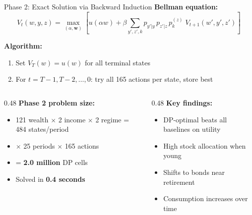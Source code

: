 \documentclass[aspectratio=169, 11pt]{beamer}
\begin{document}
\begin{frame}{Phase 2: Exact Solution via Backward Induction}
\textbf{Bellman equation:}
\[
V_t(w, y, z) = \max_{(\alpha, \mathbf{w})} \left[ u(\alpha w) + \beta \!\!\sum_{y', z', k}\!\! p_{y'|y}\, p_{z'|z}\, p_k^{(z)} \; V_{t+1}(w', y', z') \right]
\]

\textbf{Algorithm:}
\begin{enumerate}
    \item Set $V_T(w) = u(w)$ for all terminal states
    \item For $t = T{-}1, T{-}2, \ldots, 0$: try all 165 actions per state, store best
\end{enumerate}

\vspace{0.3em}
\begin{columns}[T]
\begin{column}{0.48\textwidth}
\textbf{Phase 2 problem size:}
\begin{itemize}
    \item 121 wealth $\times$ 2 income $\times$ 2 regime = 484 states/period
    \item $\times$ 25 periods $\times$ 165 actions
    \item = \textbf{2.0 million} DP cells
    \item Solved in \textbf{0.4 seconds}
\end{itemize}
\end{column}
\begin{column}{0.48\textwidth}
\textbf{Key findings:}
\begin{itemize}
    \item DP-optimal beats all baselines on utility
    \item High stock allocation when young
    \item Shifts to bonds near retirement
    \item Consumption increases over time
\end{itemize}
\end{column}
\end{columns}
\end{frame}
\end{document}
